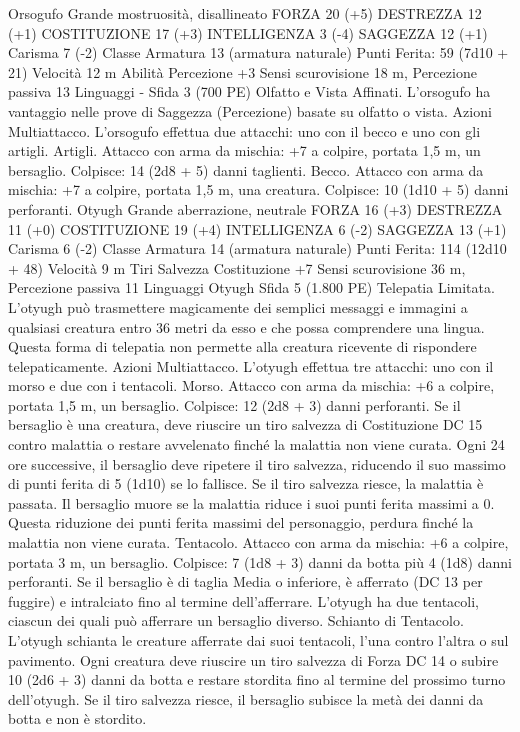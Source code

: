 \begin{multicols}{2}
Orsogufo
Grande mostruosità, disallineato
FORZA 20 (+5)
DESTREZZA 12 (+1)
COSTITUZIONE 17 (+3)
INTELLIGENZA 3 (-4)
SAGGEZZA 12 (+1)
Carisma 7 (-2)
Classe Armatura 13 (armatura naturale)
\hspace*{0pt}\hfill{Punti Ferita}: 59 (7d10 + 21)
Velocità 12 m
Abilità Percezione +3
Sensi scurovisione 18 m, Percezione passiva 13
Linguaggi -
Sfida 3 (700 PE)
Olfatto e Vista Affinati. L’orsogufo ha vantaggio nelle prove di
Saggezza (Percezione) basate su olfatto o vista.
Azioni
Multiattacco. L’orsogufo effettua due attacchi: uno con il becco
e uno con gli artigli.
Artigli. Attacco con arma da mischia: +7 a colpire, portata 1,5
m, un bersaglio.
Colpisce: 14 (2d8 + 5) danni taglienti.
Becco. Attacco con arma da mischia: +7 a colpire, portata 1,5 m,
una creatura.
Colpisce: 10 (1d10 + 5) danni perforanti.
Otyugh
Grande aberrazione, neutrale
FORZA 16 (+3)
DESTREZZA 11 (+0)
COSTITUZIONE 19 (+4)
INTELLIGENZA 6 (-2)
SAGGEZZA 13 (+1)
Carisma 6 (-2)
Classe Armatura 14 (armatura naturale)
\hspace*{0pt}\hfill{Punti Ferita}: 114 (12d10 + 48)
Velocità 9 m
Tiri Salvezza Costituzione +7
Sensi scurovisione 36 m, Percezione passiva 11
Linguaggi Otyugh
Sfida 5 (1.800 PE)
Telepatia Limitata. L’otyugh può trasmettere magicamente dei
semplici messaggi e immagini a qualsiasi creatura entro 36 metri
da esso e che possa comprendere una lingua. Questa forma di
telepatia non permette alla creatura ricevente di rispondere
telepaticamente.
Azioni
Multiattacco. L’otyugh effettua tre attacchi: uno con il morso e
due con i tentacoli.
Morso. Attacco con arma da mischia: +6 a colpire, portata 1,5
m, un bersaglio.
Colpisce: 12 (2d8 + 3) danni perforanti. Se il bersaglio è una
creatura, deve riuscire un tiro salvezza di Costituzione DC 15
contro malattia o restare avvelenato finché la malattia non viene
curata. Ogni 24 ore successive, il bersaglio deve ripetere il tiro
salvezza, riducendo il suo massimo di punti ferita di 5 (1d10) se
lo fallisce. Se il tiro salvezza riesce, la malattia è passata. Il
bersaglio muore se la malattia riduce i suoi punti ferita massimi a
0. Questa riduzione dei punti ferita massimi del personaggio,
perdura finché la malattia non viene curata.
Tentacolo. Attacco con arma da mischia: +6 a colpire, portata 3
m, un bersaglio.
Colpisce: 7 (1d8 + 3) danni da botta più 4 (1d8) danni
perforanti. Se il bersaglio è di taglia Media o inferiore, è
afferrato (DC 13 per fuggire) e intralciato fino al termine
dell’afferrare. L’otyugh ha due tentacoli, ciascun dei quali può
afferrare un bersaglio diverso.
Schianto di Tentacolo. L’otyugh schianta le creature afferrate
dai suoi tentacoli, l’una contro l’altra o sul pavimento. Ogni
creatura deve riuscire un tiro salvezza di Forza DC 14 o subire
10 (2d6 + 3) danni da botta e restare stordita fino al termine
del prossimo turno dell’otyugh. Se il tiro salvezza riesce, il
bersaglio subisce la metà dei danni da botta e non è stordito.
 

\end{multicols}
